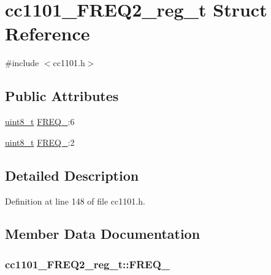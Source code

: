 \hypertarget{structcc1101___f_r_e_q2__reg__t}{}\section{cc1101\+\_\+\+F\+R\+E\+Q2\+\_\+reg\+\_\+t Struct Reference}
\label{structcc1101___f_r_e_q2__reg__t}


{\ttfamily \#include $<$cc1101.\+h$>$}

\subsection*{Public Attributes}
\begin{DoxyCompactItemize}
\item 
\hyperlink{_p_e___types_8h_aba7bc1797add20fe3efdf37ced1182c5}{uint8\+\_\+t} \hyperlink{structcc1101___f_r_e_q2__reg__t_a564233e5b8ae12e6400e71713ff1a378}{F\+R\+E\+Q\+\_}\+:6
\item 
\hyperlink{_p_e___types_8h_aba7bc1797add20fe3efdf37ced1182c5}{uint8\+\_\+t} \hyperlink{structcc1101___f_r_e_q2__reg__t_aae9a45358459aaca7329c4361f904a1d}{F\+R\+E\+Q\+\_}\+:2
\end{DoxyCompactItemize}


\subsection{Detailed Description}


Definition at line 148 of file cc1101.\+h.



\subsection{Member Data Documentation}
\subsubsection[{\texorpdfstring{F\+R\+E\+Q\+\_\+1}{FREQ_1}}]{ cc1101\+\_\+\+F\+R\+E\+Q2\+\_\+reg\+\_\+t\+::\+F\+R\+E\+Q\+\_}\hypertarget{structcc1101___f_r_e_q2__reg__t_aae9a45358459aaca7329c4361f904a1d}{}\label{structcc1101___f_r_e_q2__reg__t_aae9a45358459aaca7329c4361f904a1d}


